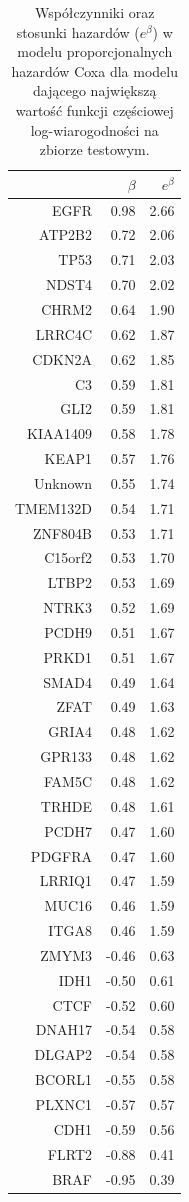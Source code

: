 \begin{table}[ht]
\centering
\begin{tabular}{rrr}
  \toprule
 & $\beta$ & $e^{\beta}$ \\ 
  \toprule
EGFR & 0.98 & 2.66 \\ 
  ATP2B2 & 0.72 & 2.06 \\ 
  TP53 & 0.71 & 2.03 \\ 
  NDST4 & 0.70 & 2.02 \\ 
  CHRM2 & 0.64 & 1.90 \\ 
  LRRC4C & 0.62 & 1.87 \\ 
  CDKN2A & 0.62 & 1.85 \\ 
  C3 & 0.59 & 1.81 \\ 
  GLI2 & 0.59 & 1.81 \\ 
  KIAA1409 & 0.58 & 1.78 \\ 
  KEAP1 & 0.57 & 1.76 \\ 
  Unknown & 0.55 & 1.74 \\ 
  TMEM132D & 0.54 & 1.71 \\ 
  ZNF804B & 0.53 & 1.71 \\ 
  C15orf2 & 0.53 & 1.70 \\ 
  LTBP2 & 0.53 & 1.69 \\ 
  NTRK3 & 0.52 & 1.69 \\ 
  PCDH9 & 0.51 & 1.67 \\ 
  PRKD1 & 0.51 & 1.67 \\ 
  SMAD4 & 0.49 & 1.64 \\ 
  ZFAT & 0.49 & 1.63 \\ 
  GRIA4 & 0.48 & 1.62 \\ 
  GPR133 & 0.48 & 1.62 \\ 
  FAM5C & 0.48 & 1.62 \\ 
  TRHDE & 0.48 & 1.61 \\ 
  PCDH7 & 0.47 & 1.60 \\ 
  PDGFRA & 0.47 & 1.60 \\ 
  LRRIQ1 & 0.47 & 1.59 \\ 
  MUC16 & 0.46 & 1.59 \\ 
  ITGA8 & 0.46 & 1.59 \\ 
  ZMYM3 & -0.46 & 0.63 \\ 
  IDH1 & -0.50 & 0.61 \\ 
  CTCF & -0.52 & 0.60 \\ 
  DNAH17 & -0.54 & 0.58 \\ 
  DLGAP2 & -0.54 & 0.58 \\ 
  BCORL1 & -0.55 & 0.58 \\ 
  PLXNC1 & -0.57 & 0.57 \\ 
  CDH1 & -0.59 & 0.56 \\ 
  FLRT2 & -0.88 & 0.41 \\ 
  BRAF & -0.95 & 0.39 \\ 
   \bottomrule
\end{tabular}
\caption{\label{tabelka}Współczynniki oraz stosunki hazardów ($e^{\beta}$) w modelu proporcjonalnych hazardów Coxa dla modelu dającego największą wartość funkcji częściowej log-wiarogodności na zbiorze testowym. }
\end{table}
